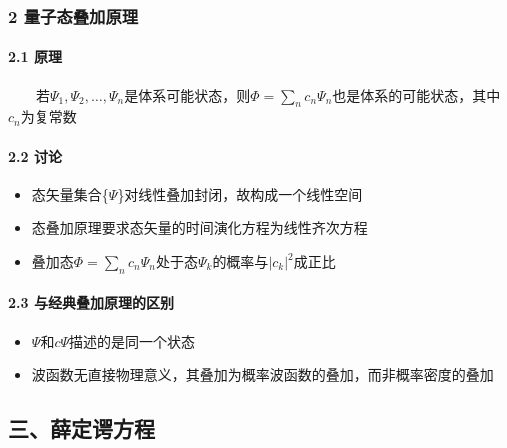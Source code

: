 \documentclass[UTF8,twocolumn]{ctexart}
\providecommand{\tightlist}{%
  \setlength{\itemsep}{0pt}\setlength{\parskip}{0pt}}
\let\oldparagraph\paragraph
\renewcommand{\paragraph}[1]{\oldparagraph{#1}\mbox{}}
\begin{document}
\hypertarget{ux91cfux5b50ux6001ux53e0ux52a0ux539fux7406}{%
\subsubsection{2
量子态叠加原理}\label{ux91cfux5b50ux6001ux53e0ux52a0ux539fux7406}}

\hypertarget{ux539fux7406}{%
\paragraph{{ }2.1 原理}\label{ux539fux7406}}

  若\(\Psi_1,\Psi_2,\ldots,\Psi_n\)是体系可能状态，则\(\Phi=\sum_nc_n\Psi_n\)也是体系的可能状态，其中\(c_n\)为复常数

\hypertarget{ux8ba8ux8bba}{%
\paragraph{{ }2.2 讨论}\label{ux8ba8ux8bba}}

\begin{itemize}
\tightlist
\item
  态矢量集合\{\(\Psi\)\}对线性叠加封闭，故构成一个线性空间
\item
  态叠加原理要求态矢量的时间演化方程为线性齐次方程
\item
  叠加态\(\Phi=\sum_nc_n\Psi_n\)处于态\(\Psi_k\)的概率与\(|c_k|^2\)成正比
\end{itemize}

\hypertarget{ux4e0eux7ecfux5178ux53e0ux52a0ux539fux7406ux7684ux533aux522b}{%
\paragraph{{ }2.3
与经典叠加原理的区别}\label{ux4e0eux7ecfux5178ux53e0ux52a0ux539fux7406ux7684ux533aux522b}}

\begin{itemize}
\tightlist
\item
  \(\Psi\)和\(c\Psi\)描述的是同一个状态
\item
  波函数无直接物理意义，其叠加为概率波函数的叠加，而非概率密度的叠加
\end{itemize}

\hypertarget{ux4e09ux859bux5b9aux8c14ux65b9ux7a0b}{%
\subsection{三、薛定谔方程}\label{ux4e09ux859bux5b9aux8c14ux65b9ux7a0b}}
\end{document}
